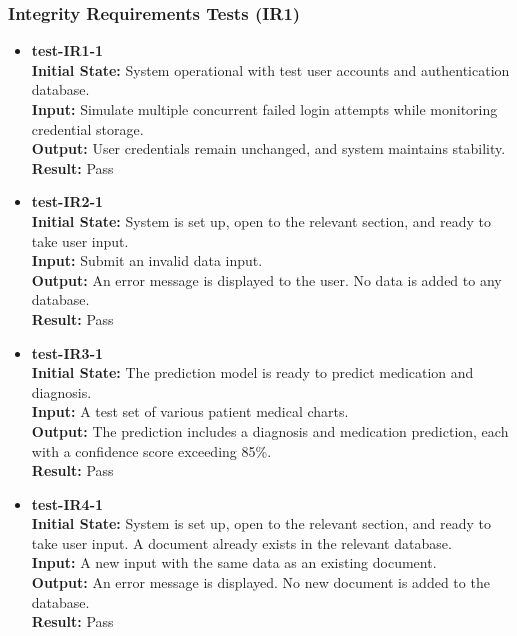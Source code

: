 \documentclass[12pt, titlepage]{article}
\begin{document}
\subsubsection{Integrity Requirements Tests (IR1)} \label{section:4.10.2}

\begin{itemize}
\item \textbf{test-IR1-1} \label{test-IR1-1} \\
\textbf{Initial State:} System operational with test user accounts and authentication database. \\
\textbf{Input:} Simulate multiple concurrent failed login attempts while monitoring credential storage. \\
\textbf{Output:} User credentials remain unchanged, and system maintains stability. \\
\textbf{Result:} Pass \\
\end{itemize}

\begin{itemize}
\item \textbf{test-IR2-1} \label{test-IR2-1} \\
\textbf{Initial State:} System is set up, open to the relevant section, and ready to take user input. \\
\textbf{Input:} Submit an invalid data input. \\
\textbf{Output:} An error message is displayed to the user. No data is added to any database. \\
\textbf{Result:} Pass \\
\end{itemize}

\begin{itemize}
\item \textbf{test-IR3-1} \label{test-IR3-1} \\
\textbf{Initial State:} The prediction model is ready to predict medication and diagnosis. \\
\textbf{Input:} A test set of various patient medical charts. \\
\textbf{Output:} The prediction includes a diagnosis and medication prediction, each with a confidence score exceeding 85\%. \\
\textbf{Result:} Pass \\
\end{itemize}

\begin{itemize}
\item \textbf{test-IR4-1} \label{test-IR4-1} \\
\textbf{Initial State:} System is set up, open to the relevant section, and ready to take user input. A document already exists in the relevant database. \\
\textbf{Input:} A new input with the same data as an existing document. \\
\textbf{Output:} An error message is displayed. No new document is added to the database. \\
\textbf{Result:} Pass \\
\end{itemize}
\end{document}
